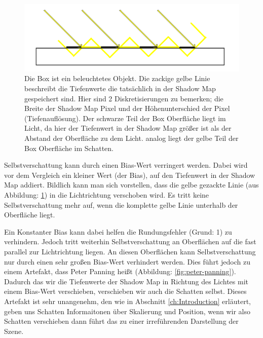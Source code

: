 \begin{figure}[H]
	\begin{center}
    \includegraphics[width=1\textwidth]{res/img/shadow-acne3/image.png}
    \caption{Die Box ist ein beleuchtetes Objekt. 
      Die zackige gelbe Linie beschreibt die Tiefenwerte die tatsächlich in der Shadow Map gespeichert sind.
      Hier sind 2 Diskretisierungen zu bemerken; 
      die Breite der Shadow Map Pixel und der Höhenunterschied der Pixel (Tiefenauflösung).
      Der schwarze Teil der Box Oberfläche liegt im Licht, 
      da hier der Tiefenwert in der Shadow Map größer ist als der Abstand der Oberfläche zu dem Licht.
      analog liegt der gelbe Teil der Box Oberfläche im Schatten.
    }
	  \label{fig:shadow-acne-illu}
	\end{center}
\end{figure}

Selbstverschattung kann durch einen Bias-Wert verringert werden.
Dabei wird vor dem Vergleich ein kleiner Wert (der Bias), auf den Tiefenwert in der Shadow Map addiert.
Bildlich kann man sich vorstellen, dass die gelbe gezackte Linie
(aus Abbildung: \ref{fig:shadow-acne-illu}) in die Lichtrichtung verschoben wird.
Es tritt keine Selbstverschattung mehr auf, wenn die komplette gelbe Linie unterhalb der Oberfläche liegt.
\par
Ein Konstanter Bias kann dabei helfen die Rundungsfehler (Grund: 1) zu verhindern.
Jedoch tritt weiterhin Selbstverschattung an Oberflächen auf die fast parallel zur Lichtrichtung liegen.
An diesen Oberflächen kann Selbstverschattung nur durch einen sehr großen Bias-Wert verhindert werden.
Dies führt jedoch zu einem Artefakt, dass Peter Panning heißt (Abbildung: \ref{fig:peter-panning}).
Dadurch das wir die Tiefenwerte der Shadow Map in Richtung des Lichtes mit einem Bias-Wert verschieben,
verschieben wir auch die Schatten selbst.
Dieses Artefakt ist sehr unangenehm, den wie in Abschnitt \ref{ch:Introduction} erläutert, geben uns Schatten Informaitonen
über Skalierung und Position, wenn wir also Schatten verschieben dann führt das zu einer irreführenden Darstellung der Szene.

